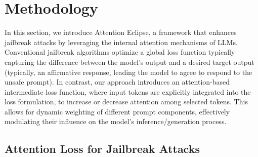 \fi





\section{Methodology}

In this section, we introduce Attention Eclipse, a framework that enhances jailbreak attacks by leveraging the internal attention mechanisms of LLMs.
Conventional jailbreak algorithms optimize a global loss function typically capturing the difference between the model's output and a desired target output (typically, an affirmative response, leading the model to agree to respond to the unsafe prompt). In contrast, our approach introduces an attention-based intermediate loss function, where input tokens are explicitly integrated into the loss formulation, to increase or decrease attention among selected tokens. This allows for dynamic weighting of different prompt components, effectively modulating their influence on the model's inference/generation process.




\subsection{Attention Loss for Jailbreak Attacks}

